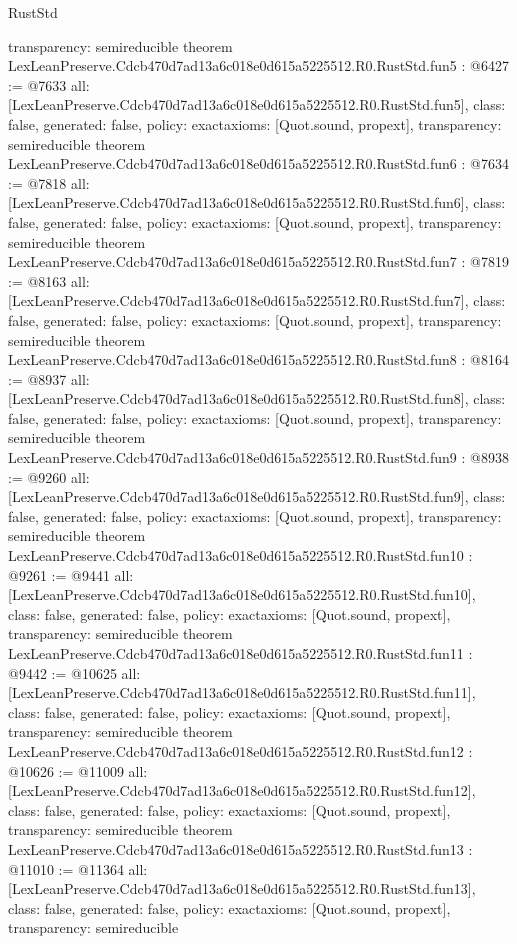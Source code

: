 \begin{lexlean}{RustStd}
\begin{coremodule}
{  transparency: semireducible
}
theorem LexLeanPreserve.Cdcb470d7ad13a6c018e0d615a5225512.R0.RustStd.fun5 : @6427 := @7633 {
  all: [LexLeanPreserve.Cdcb470d7ad13a6c018e0d615a5225512.R0.RustStd.fun5],
  class: false,
  generated: false,
  policy: exact{axioms: [Quot.sound, propext]},
  transparency: semireducible
}
theorem LexLeanPreserve.Cdcb470d7ad13a6c018e0d615a5225512.R0.RustStd.fun6 : @7634 := @7818 {
  all: [LexLeanPreserve.Cdcb470d7ad13a6c018e0d615a5225512.R0.RustStd.fun6],
  class: false,
  generated: false,
  policy: exact{axioms: [Quot.sound, propext]},
  transparency: semireducible
}
theorem LexLeanPreserve.Cdcb470d7ad13a6c018e0d615a5225512.R0.RustStd.fun7 : @7819 := @8163 {
  all: [LexLeanPreserve.Cdcb470d7ad13a6c018e0d615a5225512.R0.RustStd.fun7],
  class: false,
  generated: false,
  policy: exact{axioms: [Quot.sound, propext]},
  transparency: semireducible
}
theorem LexLeanPreserve.Cdcb470d7ad13a6c018e0d615a5225512.R0.RustStd.fun8 : @8164 := @8937 {
  all: [LexLeanPreserve.Cdcb470d7ad13a6c018e0d615a5225512.R0.RustStd.fun8],
  class: false,
  generated: false,
  policy: exact{axioms: [Quot.sound, propext]},
  transparency: semireducible
}
theorem LexLeanPreserve.Cdcb470d7ad13a6c018e0d615a5225512.R0.RustStd.fun9 : @8938 := @9260 {
  all: [LexLeanPreserve.Cdcb470d7ad13a6c018e0d615a5225512.R0.RustStd.fun9],
  class: false,
  generated: false,
  policy: exact{axioms: [Quot.sound, propext]},
  transparency: semireducible
}
theorem LexLeanPreserve.Cdcb470d7ad13a6c018e0d615a5225512.R0.RustStd.fun10 : @9261 := @9441 {
  all: [LexLeanPreserve.Cdcb470d7ad13a6c018e0d615a5225512.R0.RustStd.fun10],
  class: false,
  generated: false,
  policy: exact{axioms: [Quot.sound, propext]},
  transparency: semireducible
}
theorem LexLeanPreserve.Cdcb470d7ad13a6c018e0d615a5225512.R0.RustStd.fun11 : @9442 := @10625 {
  all: [LexLeanPreserve.Cdcb470d7ad13a6c018e0d615a5225512.R0.RustStd.fun11],
  class: false,
  generated: false,
  policy: exact{axioms: [Quot.sound, propext]},
  transparency: semireducible
}
theorem LexLeanPreserve.Cdcb470d7ad13a6c018e0d615a5225512.R0.RustStd.fun12 : @10626 := @11009 {
  all: [LexLeanPreserve.Cdcb470d7ad13a6c018e0d615a5225512.R0.RustStd.fun12],
  class: false,
  generated: false,
  policy: exact{axioms: [Quot.sound, propext]},
  transparency: semireducible
}
theorem LexLeanPreserve.Cdcb470d7ad13a6c018e0d615a5225512.R0.RustStd.fun13 : @11010 := @11364 {
  all: [LexLeanPreserve.Cdcb470d7ad13a6c018e0d615a5225512.R0.RustStd.fun13],
  class: false,
  generated: false,
  policy: exact{axioms: [Quot.sound, propext]},
  transparency: semireducible
}
\end{coremodule}
\end{lexlean}
